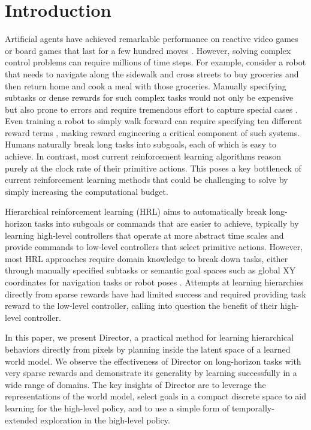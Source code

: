 

\section{Introduction}
\label{sec:intro}

Artificial agents have achieved remarkable performance on reactive video games \citep{mnih2015dqn,badia2020agent57} or board games that last for a few hundred moves \citep{silver2017alphago}.
However, solving complex control problems can require millions of time steps. For example, consider a robot that needs to navigate along the sidewalk and cross streets to buy groceries and then return home and cook a meal with those groceries. 
Manually specifying subtasks or dense rewards for such complex tasks would not only be expensive but also prone to errors and require tremendous effort to capture special cases \citep{chen2021dvd,ahn2022saycan}.
Even training a robot to simply walk forward can require specifying ten different reward terms \citep{kumar2021rma}, making reward engineering a critical component of such systems. 
Humans naturally break long tasks into subgoals, each of which is easy to achieve. 
In contrast, most current reinforcement learning algorithms reason purely at the clock rate of their primitive actions. 
This poses a key bottleneck of current reinforcement learning methods that could be challenging to solve by simply increasing the computational budget.

Hierarchical reinforcement learning (HRL) \citep{dayan1992feudal,parr1997ham,sutton1999options} aims to automatically break long-horizon tasks into subgoals or commands that are easier to achieve, typically by learning high-level controllers that operate at more abstract time scales and provide commands to low-level controllers that select primitive actions. 
However, most HRL approaches require domain knowledge to break down tasks, either through manually specified subtasks \citep{tessler2017dsn} or semantic goal spaces such as global XY coordinates for navigation tasks \citep{andrychowicz2017her,nachum2018hiro} or robot poses \citep{gehring2021hsd3}. 
Attempts at learning hierarchies directly from sparse rewards have had limited success \citep{vezhnevets2017fun} and required providing task reward to the low-level controller, calling into question the benefit of their high-level controller.

In this paper, we present Director, a practical method for learning hierarchical behaviors directly from pixels by planning inside the latent space of a learned world model. 
We observe the effectiveness of Director on long-horizon tasks with very sparse rewards and demonstrate its generality by learning successfully in a wide range of domains. 
The key insights of Director are to leverage the representations of the world model, select goals in a compact discrete space to aid learning for the high-level policy, and to use a simple form of temporally-extended exploration in the high-level policy.

